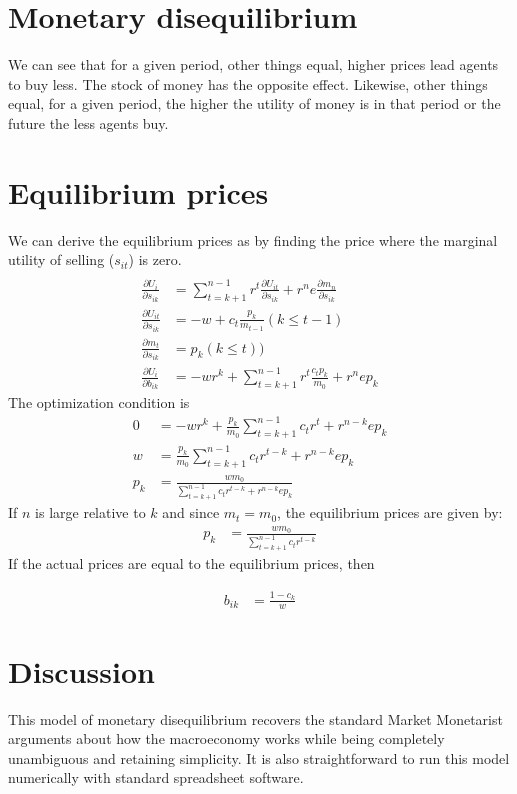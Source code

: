 \documentclass[14pt]{article} \usepackage{amsmath}
\begin{document}
\section{Monetary disequilibrium}
We can see that for a given period, other things equal, higher prices lead agents to buy less. 
The stock of money has the opposite effect.
Likewise, other things equal, for a given period, the higher the utility of money is in that period or the future the less agents buy. 
\section{Equilibrium prices}
We can derive the equilibrium prices as by finding the price where the marginal utility of selling ($s_{it}$) is zero. 
\begin{align} 
	\\\frac{ \partial U_i}{\partial s_{ik}} &= \sum\limits_{t=k +1}^{n-1} r^t \frac{\partial U_{it}}{\partial s_{ik}} + r^n e \frac{\partial m_n}{\partial s_{ik}} 
	\\\frac{\partial U_{it}}{\partial s_{ik}} &= -w + c_t \frac{p_k}{m_{t-1}} (k \leq t-1) 
	\\\frac{\partial m_t}{\partial s_{ik}} &= p_k(k \leq t)) 
	\\\frac{\partial U_i}{\partial b_{ik}} &= -w r^k + \sum\limits_{t=k+1}^{n-1} r^t\frac{c_t p_k}{m_0} + r^n e p_k 
\end{align}
The optimization condition is
\begin{align}
	0 &= -w r^k + \frac{ p_k}{m_0}\sum\limits_{t=k+1}^{n-1}c_t r^t + r^{n-k} e p_k 
	\\w &= \frac{ p_k}{m_0}\sum\limits_{t=k+1}^{n-1} c_tr^{t-k}  + r^{n -k}e p_k 
	\\ p_k&= \frac{w m_0 } {\sum\limits_{t=k+1}^{n-1} c_tr^{t-k}  + r^{n -k} e p_k }
\end{align}
If $n$ is large relative to $k$ and since $m_t = m_0$, the equilibrium prices are given by:
\begin{align} 
	 p_k&= \frac{w m_0 } {\sum\limits_{t=k+1}^{n-1} c_tr^{t-k}}
\end{align}
If the actual prices are equal to the equilibrium prices, then 

\begin{align} 
	 b_{ik} &= \frac{1 - c_k } {w}
\end{align}

\section{Discussion}
This model of monetary disequilibrium recovers the standard Market Monetarist arguments about how the macroeconomy works while being completely unambiguous and retaining simplicity. It is also straightforward to run this model numerically with standard spreadsheet software. 
\end{document}
